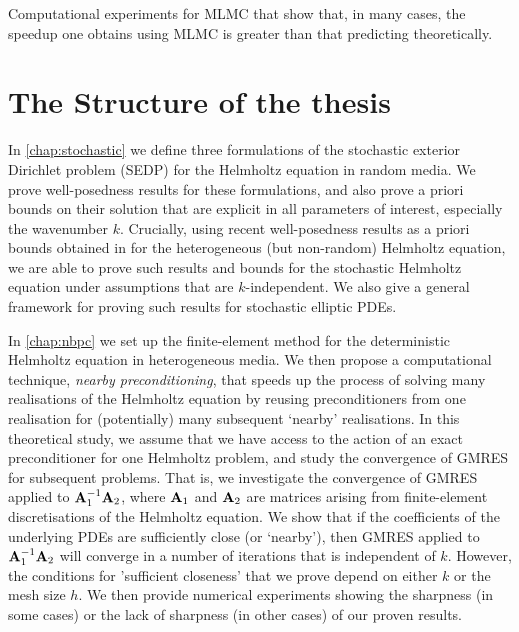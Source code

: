\item Computational experiments for MLMC that show that, in many cases, the speedup one obtains using MLMC is greater than that predicting theoretically.
\een


\section{The Structure of the thesis}

In \cref{chap:stochastic} we define three formulations of the stochastic exterior Dirichlet problem (SEDP) for the Helmholtz equation in random media. We prove well-posedness results for these formulations, and also prove a priori bounds on their solution that are explicit in all parameters of interest, especially the wavenumber $k.$ Crucially, using recent well-posedness results as a priori bounds obtained in \cite{GrPeSp:18} for the heterogeneous (but non-random) Helmholtz equation, we are able to prove such results and bounds for the stochastic Helmholtz equation under assumptions that are $k$-independent. We also give a general framework for proving such results for stochastic elliptic PDEs.

In \cref{chap:nbpc} we set up the finite-element method for the deterministic Helmholtz equation in heterogeneous media. We then propose a computational technique, \emph{nearby preconditioning}, that speeds up the process of solving many realisations of the Helmholtz equation by reusing preconditioners from one realisation for (potentially) many subsequent `nearby' realisations. In this theoretical study, we assume that we have access to the action of an exact preconditioner for one Helmholtz problem, and study the convergence of GMRES for subsequent problems. That is, we investigate the convergence of GMRES applied to $\mathbf{A}_{1}^{-1}\mathbf{A}_{2}$, where $\mathbf{A}_{1}$ and $\mathbf{A}_{2}$ are matrices arising from finite-element discretisations of the Helmholtz equation. We show that if the coefficients of the underlying PDEs are sufficiently close (or `nearby'), then GMRES applied to $\mathbf{A}_{1}^{-1}\mathbf{A}_{2}$ will converge in a number of iterations that is independent of $k.$ However, the conditions for 'sufficient closeness' that we prove depend on either $k$ or the mesh size $h$. We then provide numerical experiments showing the sharpness (in some cases) or the lack of sharpness (in other cases) of our proven results.


